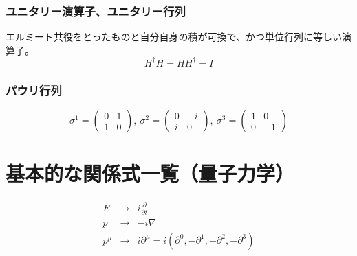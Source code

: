 \subsubsection{ユニタリー演算子、ユニタリー行列}
エルミート共役をとったものと自分自身の積が可換で、かつ単位行列に等しい演算子。
\begin{equation}
H^{\dagger}H=HH^{\dagger}=I
\end{equation}

\subsubsection{パウリ行列}
\begin{equation}
  \sigma^1 = 
  \left(
    \begin{array}{cc}
      0 & 1 \\
      1 & 0 
    \end{array}
  \right),~
  \sigma^2 = 
  \left(
    \begin{array}{cc}
      0 & -i \\
      i & 0 
    \end{array}
  \right),~
  \sigma^3 = 
  \left(
    \begin{array}{cc}
      1 & 0 \\
      0 & -1 
    \end{array}
  \right)
\end{equation}

\section{基本的な関係式一覧（量子力学）}
\begin{eqnarray}
  E &\to& i\frac{\partial}{\partial t} \\
  p &\to& -i\nabla \\
  p^{\mu} &\to& i\partial^{\mu} = i(\partial^0, -\partial^1, -\partial^2, -\partial^3)
\end{eqnarray}



